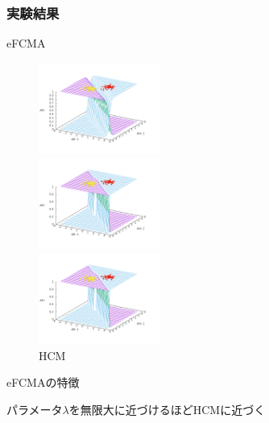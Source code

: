 \documentclass[13pt,dvipdfmx]{beamer}
\begin{document}
\begin{frame}\frametitle{実験結果}
  \begin{block}{eFCMA}
    \begin{figure}[htbp]
      \begin{minipage}{0.32\hsize}
        \begin{center}
          \includegraphics[width=40mm]{eFCMA-Lambda1.png}
        \end{center}
        \captionsetup{labelformat=empty,labelsep=none}
        \caption{$\lambda=1$}
        \label{fig:one}
      \end{minipage}
      \begin{minipage}{0.32\hsize}
        \begin{center}
          \includegraphics[width=40mm]{eFCMA-Lambda10000.png}
        \end{center}
        \captionsetup{labelformat=empty,labelsep=none}
        \caption{$\lambda=10000$}
        \label{fig:two}
      \end{minipage}
     \begin{minipage}{0.32\hsize}
        \begin{center}
          \includegraphics[width=40mm]{HCM.png}
        \end{center}
        \captionsetup{labelformat=empty,labelsep=none}
        \caption{HCM}
      \label{fig:three}
     \end{minipage}
    \end{figure}
  \end{block}
  \begin{block}{eFCMAの特徴}
    \begin{center}
      パラメータ$\lambda$を無限大に近づけるほどHCMに近づく
    \end{center}
  \end{block}
\end{frame}
\end{document}
